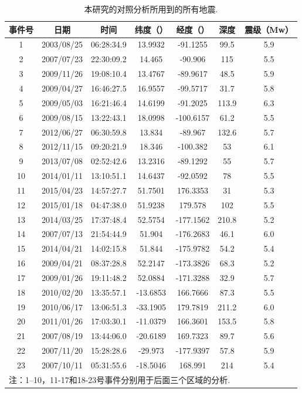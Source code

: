 \begin{table}[ht]
	\centering
	\caption{本研究的对照分析所用到的所有地震.}
	\begin{tabular}{*{7}{c}}
	\hline
	事件号 & 日期 & 时间 & 纬度（\textdegree） & 经度（\textdegree） & 深度 & 震级（Mw）\\
	\hline
1 & 2003/08/25 & 06:28:34.9 &  13.9932 &  -91.1255 &  99.5 & 5.9\\
2 & 2007/07/23 & 22:30:09.2 &  14.465  &  -90.906  &  115  & 5.5\\
3 & 2009/11/26 & 19:08:10.4 &  13.4767 &  -89.9617 &  48.5 & 5.9\\
4 & 2009/04/27 & 16:46:27.5 &  16.9557 &  -99.5717 &  31.7 & 5.8\\
5 & 2009/05/03 & 16:21:46.4 &  14.6199 &  -91.2025 &  113.9 & 6.3\\
6 & 2009/08/15 & 13:22:43.1 &  18.0998 & -100.6157 &  61.2 & 5.5\\
7 & 2012/06/27 & 06:30:59.8 &  13.834  &  -89.967  &  132.6 & 5.7\\
8 & 2012/11/15 & 09:20:21.9 &  18.346  & -100.382  &  53  & 6.1\\
9 & 2013/07/08 & 02:52:42.6 &  13.2316 &  -89.1292 &  55  & 5.7\\
10 & 2014/01/11 & 13:10:51.1 &  14.6437 &  -92.0592 &  78  & 5.5\\
11 & 2015/04/23 & 14:57:27.7 &  51.7501 &  176.3353 &  31  & 5.3\\
12 & 2015/01/18 & 04:47:38.0 &  51.9238 &  179.578  &  102  & 5.5\\
13 & 2014/03/25 & 17:37:48.4 &  52.5754 & -177.1562 &  210.8 & 5.2\\
14 & 2007/07/13 & 21:54:44.9 &  51.904  & -176.2683 &  46.1 & 6.0\\
15 & 2014/04/21 & 14:02:15.8 &  51.844  & -175.9782 &  54.2 & 5.4\\
16 & 2009/04/21 & 08:37:28.8 &  52.2147 & -173.3826 &  68.3 & 5.2\\
17 & 2009/01/26 & 19:11:48.2 &  52.0884 & -171.3288 &  32.9 & 5.7\\
18 & 2010/02/20 & 13:35:57.1 & -13.6853 &  166.7666 &  87.3 & 5.5\\
19 & 2010/06/17 & 13:06:51.3 & -33.1905 &  179.7819 &  211.2 & 6.0\\
20 & 2011/01/26 & 17:03:30.1 & -11.0379 &  166.3601 &  153.5 & 5.8\\
21 & 2007/08/19 & 13:44:06.0 & -20.6189 &  169.7323 &  89.7 & 5.6\\
22 & 2007/11/20 & 15:28:28.6 & -29.973  & -177.9397 &  57.8 & 5.9\\
23 & 2007/10/11 & 05:31:55.6 & -18.5046 &  168.991  &  214  & 5.4\\
	\hline
\multicolumn{7}{l}{\footnotesize{注：1--10，11-17和18-23号事件分别用于后面三个区域的分析.}}
\end{tabular}
\label{evt}
\end{table}

